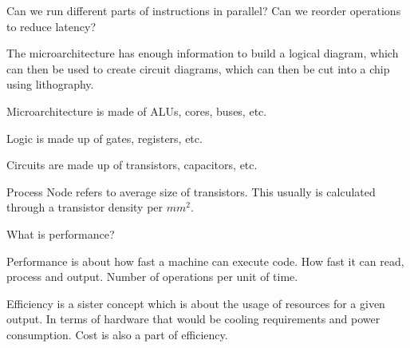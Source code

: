 \documentclass{report}
\begin{document}
\begin{description}
\begin{mdframed}
            Can we run different parts of instructions in
            parallel? Can we reorder operations to reduce
            latency?

            The microarchitecture has enough information to
            build a logical diagram, which can then be used
            to create circuit diagrams, which can then be
            cut into a chip using lithography.

            Microarchitecture is made of ALUs, cores,
            buses, etc.

            Logic is made up of gates, registers, etc.

            Circuits are made up of transistors, capacitors,
            etc.

            Process Node refers to average size of transistors.
            This usually is calculated through a transistor
            density per $mm^2$.
        \end{mdframed}
    \item What is performance?
        \begin{mdframed}
            Performance is about how fast a machine can
            execute code. How fast it can read, process and
            output. Number of operations per unit of time.


            Efficiency is a sister concept which is about
            the usage of resources for a given output.
            In terms of hardware that would be cooling
            requirements and power consumption. Cost is
            also a part of efficiency.
        \end{mdframed}

\end{description}
\end{document}

